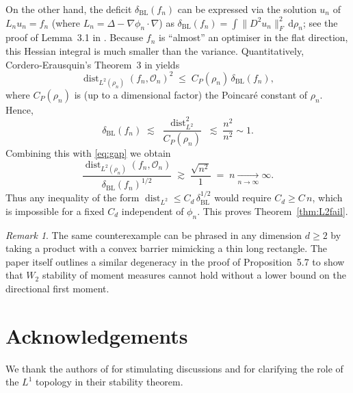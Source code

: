 \documentclass{article}
\theoremstyle{definition}
\theoremstyle{remark}
\newtheorem{remark}[theorem]{Remark}
\DeclareMathOperator{\dist}{dist}
\begin{document}
On the other hand, the deficit $\delta_{\mathrm{BL}}(f_n)$ can be expressed via the solution $u_n$ of
$L_n u_n = f_n$ (where $L_n = \Delta-\nabla\phi_n\cdot\nabla$) as
$\delta_{\mathrm{BL}}(f_n) = \int\|D^2 u_n\|_F^2\,\mathrm{d}\rho_n$; see the proof of Lemma~3.1 in
\cite{BLpaper}.  Because $f_n$ is ``almost'' an optimiser in the flat direction, this Hessian integral
is much smaller than the variance.  Quantitatively, Cordero‑Erausquin's Theorem~3 in \cite{CE17} yields
\[
\dist_{L^2(\rho_n)}(f_n,\mathcal{O}_n)^2 \;\le\; C_P(\rho_n)\,\delta_{\mathrm{BL}}(f_n),
\]
where $C_P(\rho_n)$ is (up to a dimensional factor) the Poincar\'e constant of $\rho_n$.  Hence,
\[
\delta_{\mathrm{BL}}(f_n) \;\lesssim\; \frac{\dist_{L^2}^2}{C_P(\rho_n)} \;\lesssim\; \frac{n^2}{n^2} \sim 1 .
\]
Combining this with \eqref{eq:gap} we obtain
\[
\frac{\dist_{L^2(\rho_n)}(f_n,\mathcal{O}_n)}{\delta_{\mathrm{BL}}(f_n)^{1/2}}
\;\gtrsim\; \frac{\sqrt{n^2}}{1} \;=\; n \xrightarrow[n\to\infty]{} \infty .
\]
Thus any inequality of the form $\dist_{L^2}\le C_d\,\delta_{\mathrm{BL}}^{1/2}$ would require
$C_d\ge C\,n$, which is impossible for a fixed $C_d$ independent of $\phi_n$.  This proves
Theorem~\ref{thm:L2fail}.

\begin{remark}
The same counterexample can be phrased in any dimension $d\ge2$ by taking a product with a convex
barrier mimicking a thin long rectangle.  The paper \cite{BLpaper} itself outlines a similar degeneracy
in the proof of Proposition~5.7 to show that $W_2$ stability of moment measures cannot hold without
a lower bound on the directional first moment.
\end{remark}

\section*{Acknowledgements}
We thank the authors of \cite{BLpaper} for stimulating discussions and for clarifying the role of the
$L^1$ topology in their stability theorem.
\end{document}
